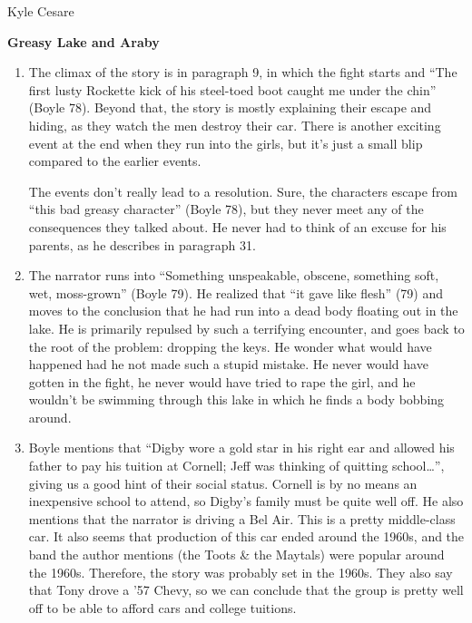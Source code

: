\documentclass[12pt,letterpaper]{article}
\begin{document}
\begin{flushright}
Kyle Cesare
\end{flushright}

{\center\textbf{Greasy Lake and Araby} \\}

\begin{enumerate}

\item The climax of the story is in paragraph 9, in which the fight starts and
``The first lusty Rockette kick of his steel-toed boot caught me under the
chin'' (Boyle 78).  Beyond that, the story is mostly explaining their escape and
hiding, as they watch the men destroy their car.  There is another exciting
event at the end when they run into the girls, but it's just a small blip
compared to the earlier events.

The events don't really lead to a resolution.  Sure, the characters escape from
``this bad greasy character'' (Boyle 78), but they never meet any of the
consequences they talked about.  He never had to think of an excuse for his
parents, as he describes in paragraph 31.

\item The narrator runs into ``Something unspeakable, obscene, something soft,
wet, moss-grown'' (Boyle 79).  He realized that ``it gave like flesh'' (79) and
moves to the conclusion that he had run into a dead body floating out in the
lake.  He is primarily repulsed by such a terrifying encounter, and goes back to
the root of the problem: dropping the keys.  He wonder what would have happened
had he not made such a stupid mistake.  He never would have gotten in the fight,
he never would have tried to rape the girl, and he wouldn't be swimming through
this lake in which he finds a body bobbing around.

\item Boyle mentions that ``Digby wore a gold star in his right ear and allowed
his father to pay his tuition at Cornell; Jeff was thinking of quitting
school\dots'', giving us a good hint of their social status.  Cornell is by no
means an inexpensive school to attend, so Digby's family must be quite well off.
He also mentions that the narrator is driving a Bel Air.  This is a pretty
middle-class car.  It also seems that production of this car ended around the
1960s, and the band the author mentions (the Toots \& the Maytals) were popular
around the 1960s.  Therefore, the story was probably set in the 1960s.  They
also say that Tony drove a '57 Chevy, so we can conclude that the group is
pretty well off to be able to afford cars and college tuitions.


\end{enumerate}
\end{document}
